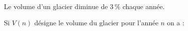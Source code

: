 
Le volume d'un glacier diminue de $3\,\%$ chaque année.

Si $V(n)$ désigne le volume du glacier pour l'année $n$ on a :

\smallskip

